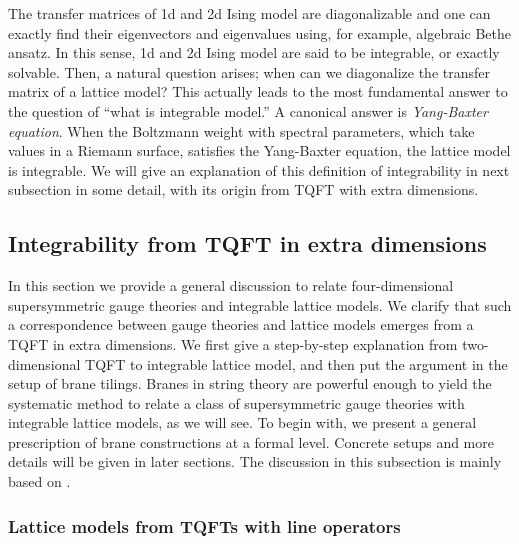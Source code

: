 The transfer matrices of 1d and 2d Ising model are diagonalizable
and one can exactly find their eigenvectors and eigenvalues using,
for example, algebraic Bethe ansatz. In this sense, 1d and 2d Ising
model are said to be integrable, or exactly solvable. Then, a natural
question arises; when can we diagonalize the transfer matrix of a
lattice model? This actually leads to the most fundamental answer
to the question of ``what is integrable model.'' A canonical answer
is \emph{Yang-Baxter equation}. When the Boltzmann weight with spectral
parameters, which take values in a Riemann surface, satisfies the
Yang-Baxter equation, the lattice model is integrable. We will give
an explanation of this definition of integrability in next subsection
in some detail, with its origin from TQFT with extra dimensions. 






\subsection{Integrability from TQFT in extra dimensions}

In this section we provide a general discussion to relate four-dimensional
supersymmetric gauge theories and integrable lattice models. We clarify
that such a correspondence between gauge theories and lattice models
emerges from a TQFT in extra dimensions. We first give a step-by-step
explanation from two-dimensional TQFT to integrable lattice model,
and then put the argument in the setup of brane tilings. Branes in
string theory are powerful enough to yield the systematic method to
relate a class of supersymmetric gauge theories with integrable lattice
models, as we will see. To begin with, we present a general prescription
of brane constructions at a formal level. Concrete setups and more
details will be given in later sections. 
The discussion in this subsection is mainly based on \cite{Yagi:2016oum}. 

\subsubsection{Lattice models from TQFTs with line operators}

